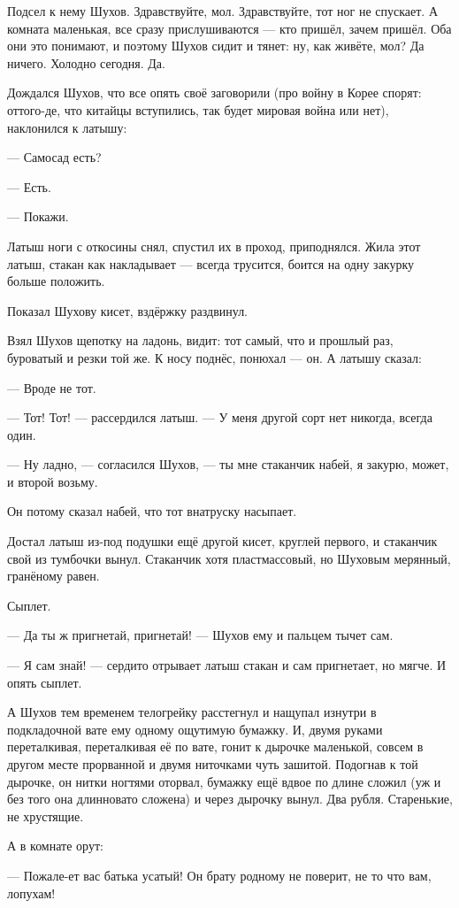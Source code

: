 Подсел к нему Шухов. Здравствуйте, мол. Здравствуйте, тот ног не спускает. А комната маленькая, все сразу прислушиваются --- кто пришёл, зачем пришёл. Оба они это понимают, и поэтому Шухов сидит и тянет: ну, как живёте, мол? Да ничего. Холодно сегодня. Да.

Дождался Шухов, что все опять своё заговорили (про войну в Корее спорят: оттого-де, что китайцы вступились, так будет мировая война или нет), наклонился к латышу:

--- Самосад есть?

--- Есть.

--- Покажи.

Латыш ноги с откосины снял, спустил их в проход, приподнялся. Жила этот латыш, стакан как накладывает --- всегда трусится, боится на одну закурку больше положить.

Показал Шухову кисет, вздёржку раздвинул.

Взял Шухов щепотку на ладонь, видит: тот самый, что и прошлый раз, буроватый и резки той же. К носу поднёс, понюхал --- он. А латышу сказал:

--- Вроде не тот.

--- Тот! Тот! --- рассердился латыш. --- У меня другой сорт нет никогда, всегда один.

--- Ну ладно, --- согласился Шухов, --- ты мне стаканчик набей, я закурю, может, и второй возьму.

Он потому сказал набей, что тот внатруску насыпает.

Достал латыш из-под подушки ещё другой кисет, круглей первого, и стаканчик свой из тумбочки вынул. Стаканчик хотя пластмассовый, но Шуховым мерянный, гранёному равен.

Сыплет.

--- Да ты ж пригнетай, пригнетай! --- Шухов ему и пальцем тычет сам.

--- Я сам знай! --- сердито отрывает латыш стакан и сам пригнетает, но мягче. И опять сыплет.

А Шухов тем временем телогрейку расстегнул и нащупал изнутри в подкладочной вате ему одному ощутимую бумажку. И, двумя руками переталкивая, переталкивая её по вате, гонит к дырочке маленькой, совсем в другом месте прорванной и двумя ниточками чуть зашитой. Подогнав к той дырочке, он нитки ногтями оторвал, бумажку ещё вдвое по длине сложил (уж и без того она длинновато сложена) и через дырочку вынул. Два рубля. Старенькие, не хрустящие.

А в комнате орут:

--- Пожале-ет вас батька усатый! Он брату родному не поверит, не то что вам, лопухам!

